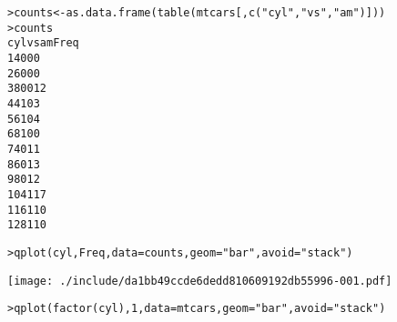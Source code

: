 % 
% 
% 
\begin{alltt}
> counts <- as.data.frame(table(mtcars[, c("cyl", "vs", "am")]))
> counts
   cyl vs am Freq
1    4  0  0    0
2    6  0  0    0
3    8  0  0   12
4    4  1  0    3
5    6  1  0    4
6    8  1  0    0
7    4  0  1    1
8    6  0  1    3
9    8  0  1    2
10   4  1  1    7
11   6  1  1    0
12   8  1  1    0

\end{alltt}
% 
% 
\begin{alltt}
> qplot(cyl, Freq, data = counts, geom = "bar", avoid = "stack")
\end{alltt}
\texttt{[image: ./include/da1bb49ccde6dedd810609192db55996-001.pdf]}
\begin{alltt}

\end{alltt}
% 
% 
% 
% 
\begin{alltt}
> qplot(factor(cyl), 1, data = mtcars, geom = "bar", avoid = "stack")
\end{alltt}
